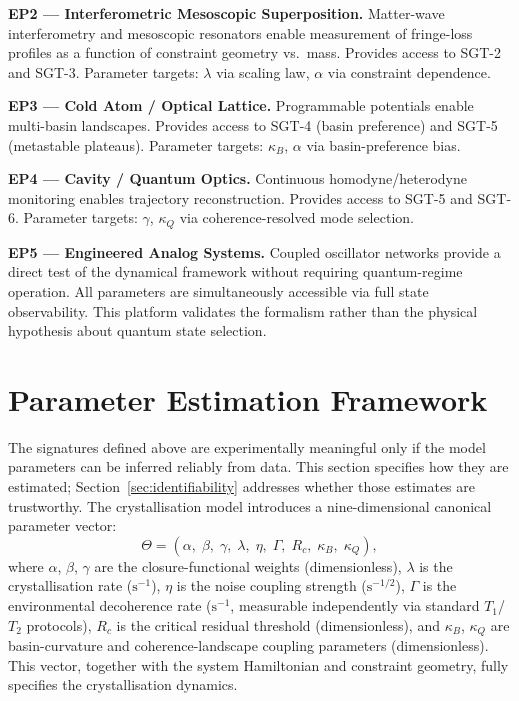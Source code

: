 \documentclass[12pt]{article}
\begin{document}
\textbf{EP2 --- Interferometric Mesoscopic Superposition.} Matter-wave interferometry and mesoscopic resonators enable measurement of fringe-loss profiles as a function of constraint geometry vs.\ mass. Provides access to SGT-2 and SGT-3. Parameter targets: $\lambda$ via scaling law, $\alpha$ via constraint dependence.

\textbf{EP3 --- Cold Atom / Optical Lattice.} Programmable potentials enable multi-basin landscapes. Provides access to SGT-4 (basin preference) and SGT-5 (metastable plateaus). Parameter targets: $\kappa_B$, $\alpha$ via basin-preference bias.

\textbf{EP4 --- Cavity / Quantum Optics.} Continuous homodyne/heterodyne monitoring enables trajectory reconstruction. Provides access to SGT-5 and SGT-6. Parameter targets: $\gamma$, $\kappa_Q$ via coherence-resolved mode selection.

\textbf{EP5 --- Engineered Analog Systems.} Coupled oscillator networks provide a direct test of the dynamical framework without requiring quantum-regime operation. All parameters are simultaneously accessible via full state observability. This platform validates the formalism rather than the physical hypothesis about quantum state selection.

\section{Parameter Estimation Framework}
\label{sec:estimation}

The signatures defined above are experimentally meaningful only if the model parameters can be inferred reliably from data. This section specifies how they are estimated; Section~\ref{sec:identifiability} addresses whether those estimates are trustworthy. The crystallisation model introduces a nine-dimensional canonical parameter vector:
\begin{equation}\label{eq:theta}
\Theta = (\alpha,\; \beta,\; \gamma,\; \lambda,\; \eta,\; \Gamma,\; R_c,\; \kappa_B,\; \kappa_Q),
\end{equation}
where $\alpha$, $\beta$, $\gamma$ are the closure-functional weights (dimensionless), $\lambda$ is the crystallisation rate ($\mathrm{s}^{-1}$), $\eta$ is the noise coupling strength ($\mathrm{s}^{-1/2}$), $\Gamma$ is the environmental decoherence rate ($\mathrm{s}^{-1}$, measurable independently via standard $T_1$/$T_2$ protocols), $R_c$ is the critical residual threshold (dimensionless), and $\kappa_B$, $\kappa_Q$ are basin-curvature and coherence-landscape coupling parameters (dimensionless). This vector, together with the system Hamiltonian and constraint geometry, fully specifies the crystallisation dynamics.
\end{document}
